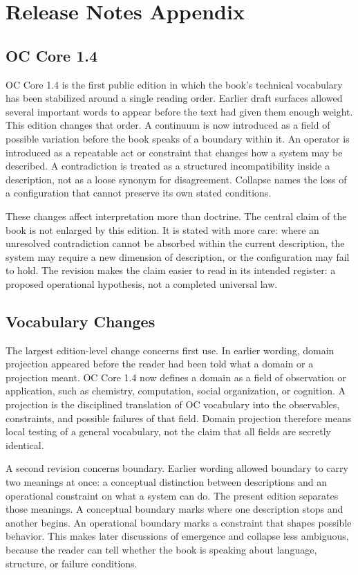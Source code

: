 \documentclass[11pt,a4paper,openany]{book}
\begin{document}
\section{Release Notes Appendix}
\subsection{OC Core 1.4}
OC Core 1.4 is the first public edition in which the book's technical vocabulary has been stabilized around a single reading order. Earlier draft surfaces allowed several important words to appear before the text had given them enough weight. This edition changes that order. A continuum is now introduced as a field of possible variation before the book speaks of a boundary within it. An operator is introduced as a repeatable act or constraint that changes how a system may be described. A contradiction is treated as a structured incompatibility inside a description, not as a loose synonym for disagreement. Collapse names the loss of a configuration that cannot preserve its own stated conditions. \cite{kauffman_autocatalytic,raf_networks}\par
These changes affect interpretation more than doctrine. The central claim of the book is not enlarged by this edition. It is stated with more care: where an unresolved contradiction cannot be absorbed within the current description, the system may require a new dimension of description, or the configuration may fail to hold. The revision makes the claim easier to read in its intended register: a proposed operational hypothesis, not a completed universal law.\par
\subsection{Vocabulary Changes}
The largest edition-level change concerns first use. In earlier wording, domain projection appeared before the reader had been told what a domain or a projection meant. OC Core 1.4 now defines a domain as a field of observation or application, such as chemistry, computation, social organization, or cognition. A projection is the disciplined translation of OC vocabulary into the observables, constraints, and possible failures of that field. Domain projection therefore means local testing of a general vocabulary, not the claim that all fields are secretly identical. \cite{kauffman_autocatalytic,raf_networks}\par
A second revision concerns boundary. Earlier wording allowed boundary to carry two meanings at once: a conceptual distinction between descriptions and an operational constraint on what a system can do. The present edition separates those meanings. A conceptual boundary marks where one description stops and another begins. An operational boundary marks a constraint that shapes possible behavior. This makes later discussions of emergence and collapse less ambiguous, because the reader can tell whether the book is speaking about language, structure, or failure conditions.\par
\end{document}
